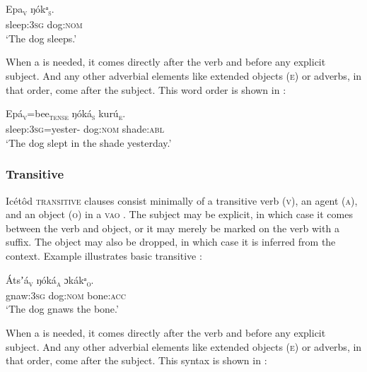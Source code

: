 \ea\label{ex:syn:11}
\gll Epa\textsc{\textsubscript{v}}\textsc{}    ŋókᵃ\textsc{\textsubscript{s}}. \\
sleep:\textsc{3sg}   dog:\textsc{nom}    \\
\glt ‘The dog sleeps.’ 
\z


When a   is needed, it comes directly after the verb and before any explicit subject. And any other adverbial elements like extended objects (\textsc{e}) or adverbs, in that order, come after the subject. This word order is shown in :



\ea\label{ex:syn:12}
\gll Epá\textsc{\textsubscript{v}}=bee\textsc{\textsubscript{tense}}   ŋóká\textsc{\textsubscript{s}}     kurú\textsc{\textsubscript{e}}. \\
sleep:\textsc{3sg}=yester-   dog:\textsc{nom}   shade:\textsc{abl}    \\
\glt ‘The dog slept in the shade yesterday.’ 
\z




\subsubsection{Transitive}\label{sec:10.2.2}

Icétôd \textsc{transitive} clauses consist minimally of a transitive verb (\textsc{v}), an agent (\textsc{a}), and an object (\textsc{o}) in a \textsc{vao} . The subject may be explicit, in which case it comes between the verb and object, or it may merely be marked on the verb with a suffix. The object may also be dropped, in which case it is inferred from the context. Example  illustrates basic transitive :




\ea\label{ex:syn:13}
\gll Átsʼá\textsc{\textsubscript{v}}    ŋóká\textsc{\textsubscript{a}}    ɔkákᵃ\textsc{\textsubscript{o}}\textsc{.} \\
gnaw:\textsc{3sg}  dog:\textsc{nom}  bone:\textsc{acc}    \\
\glt ‘The dog gnaws the bone.’ 
\z


When a   is needed, it comes directly after the verb and before any explicit subject. And any other adverbial elements like extended objects (\textsc{e}) or adverbs, in that order, come after the subject. This syntax is shown in :



